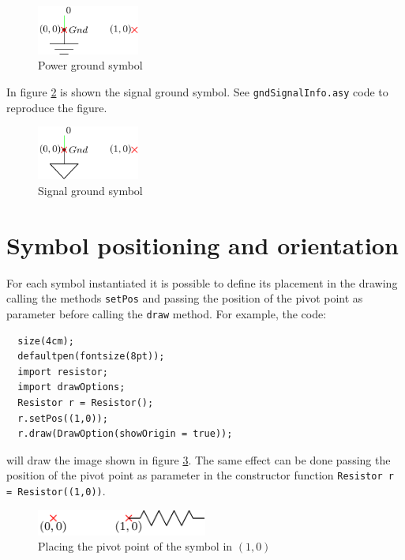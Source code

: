 \documentclass[a4paper,12pt]{report}
\begin{document}
\begin{figure}[ht]
\centering
\includegraphics[width=0.3\textwidth]{gndPowerInfo}
\caption{Power ground symbol}
\label{fig:gndPowerInfo}
\end{figure}

In figure \ref{fig:gndSignalInfo} is shown the signal ground symbol. See \texttt{gndSignalInfo.asy} code to reproduce the figure.

\begin{figure}[ht]
\centering
\includegraphics[width=0.3\textwidth]{gndSignalInfo}
\caption{Signal ground symbol}
\label{fig:gndSignalInfo}
\end{figure}

\clearpage
\section*{Symbol positioning and orientation}
For each symbol instantiated it is possible to define its placement in the drawing calling the methods \texttt{setPos} and passing the position of the pivot point as parameter before calling the \texttt{draw} method. For example, the code:
\begin{lstlisting}
  size(4cm);
  defaultpen(fontsize(8pt));
  import resistor;
  import drawOptions;
  Resistor r = Resistor();
  r.setPos((1,0));
  r.draw(DrawOption(showOrigin = true));
\end{lstlisting}
will draw the image shown in figure \ref{fig:placingExample1}. The same effect can be done passing the position of the pivot point as parameter in the constructor function \texttt{Resistor r = Resistor((1,0))}.
\begin{figure}[ht]
  \centering
  \includegraphics[width=0.5\textwidth]{placingExample1.pdf}
  \caption{Placing the pivot point of the symbol in $(1,0)$}
  \label{fig:placingExample1}
\end{figure}
\end{document}
